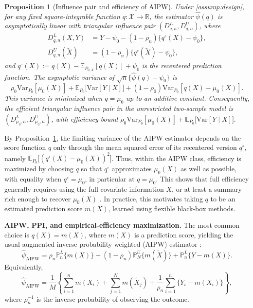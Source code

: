\documentclass{article}
\theoremstyle{plain}
\newtheorem{proposition}{Proposition}
\theoremstyle{definition}
\newcommand{\E}{\mathbb{E}}
\newcommand{\Var}{\mathrm{Var}}
\newcommand{\R}{\mathbb{R}}
\newcommand{\1}{\mathbf{1}}
\newcommand{\rhozero}{\rho_0}
\newcommand{\rhon}{\rho_n}
\newcommand{\Pl}{\mathbb{P}^{L}_n}
\newcommand{\Pu}{\mathbb{P}^{U}_N}
\newcommand{\Px}{P_{0,X}}
\begin{document}
\begin{proposition}[Influence pair and efficiency of AIPW]
\label{prop:aipw-class}
Under \cref{assump:design}, for any fixed square-integrable
function $q:\mathcal X\to\R$, the estimator $\widehat\psi(q)$
is asymptotically linear with triangular influence pair
$(D_{q,n}^L,D_{q,n}^U)$, where
\begin{align*}
D_{q,n}^L(X,Y)
&=
Y-\psi_0-(1-\rho_n)\{q^\circ(X)-\psi_0\},\\
D_{q,n}^U(\widetilde X)
&=
(1-\rho_n)\{q^\circ(\widetilde X)-\psi_0\},
\end{align*}
and $q^\circ(X):=q(X)-\E_{\Px}[q(X)]+\psi_0$
is the recentered prediction function. The asymptotic variance
of $\sqrt n\{\widehat\psi(q)-\psi_0\}$ is
\[
\rhozero\Var_{P_0}[\mu_0(X)]
+
\E_{P_0}\!\bigl[\Var[Y\mid X]\bigr]
+
(1-\rhozero)\Var_{P_0}[q(X)-\mu_0(X)].
\]
This variance is minimized when $q=\mu_0$ up to an additive
constant. Consequently, the efficient triangular influence
pair in the unrestricted two-sample model is
$(D_{\mu_0,n}^L,D_{\mu_0,n}^U)$, with efficiency bound $\rhozero\Var_{P_0}[\mu_0(X)]
+
\E_{P_0}\!\bigl[\Var[Y\mid X]\bigr].$
\end{proposition}

By Proposition~\ref{prop:aipw-class}, the limiting variance of the AIPW estimator depends on the score function \(q\) only through the mean squared error of its recentered version \(q^\circ\), namely \(\E_{P_0}\!\bigl[(q^\circ(X)-\mu_0(X))^2\bigr]\). Thus, within the AIPW class, efficiency is maximized by choosing \(q\) so that \(q^\circ\) approximates \(\mu_0(X)\) as well as possible, with equality when \(q^\circ=\mu_0\), in particular at \(q=\mu_0\). This shows that full efficiency generally requires using the full covariate information \(X\), or at least a summary rich enough to recover \(\mu_0(X)\) \citep{robins1995semiparametric}. In practice, this motivates taking \(q\) to be an estimated prediction score \(m(X)\), learned using flexible black-box methods.

\textbf{AIPW, PPI, and empirical-efficiency maximization.}
The most common choice is \(q(X)=m(X)\), where \(m(X)\) is a prediction score, yielding the usual augmented inverse-probability weighted (AIPW) estimator \citep{robins1994estimation}:
\[
\widehat{\psi}_{\mathrm{AIPW}}
=
\rhon \Pl\{m(X)\}
+
(1-\rhon)\Pu\{m(\widetilde X)\}
+
\Pl\{Y-m(X)\}.
\]
Equivalently,
\[
\widehat{\psi}_{\mathrm{AIPW}}
=
\frac{1}{M}\left\{
\sum_{i=1}^n m(X_i)
+
\sum_{j=1}^N m(\widetilde X_j)
+
\frac{1}{\rho_n}\sum_{i=1}^n \{Y_i-m(X_i)\}
\right\},
\]
where \(\rho_n^{-1}\) is the inverse probability of observing the outcome.
\end{document}
